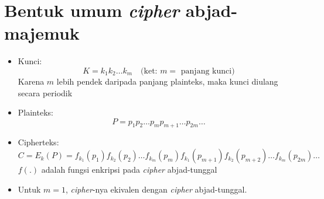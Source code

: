 \documentclass{article}
\begin{document}

\section*{Bentuk umum \textit{cipher} abjad-majemuk}

\begin{itemize}
    \item Kunci:
    \[ K = k_1 k_2 \dots k_m \quad \text{(ket: } m = \text{ panjang kunci)} \]
    Karena $m$ lebih pendek daripada panjang plainteks, maka kunci diulang secara periodik
    
    \item Plainteks:
    \[ P = p_1 p_2 \dots p_m p_{m+1} \dots p_{2m} \dots \]
    
    \item Cipherteks:
    \[ C = E_k(P) = f_{k_1}(p_1) f_{k_2}(p_2) \dots f_{k_m}(p_m) f_{k_1}(p_{m+1}) f_{k_2}(p_{m+2}) \dots f_{k_m}(p_{2m}) \dots \]
    $f(.)$ adalah fungsi enkripsi pada \textit{cipher} abjad-tunggal

    \item Untuk $m = 1$, \textit{cipher}-nya ekivalen dengan \textit{cipher} abjad-tunggal.
\end{itemize}
\end{document}
